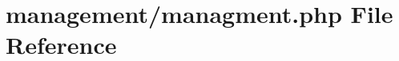 \hypertarget{managment_8php}{}\section{management/managment.php File Reference}
\label{managment_8php}
